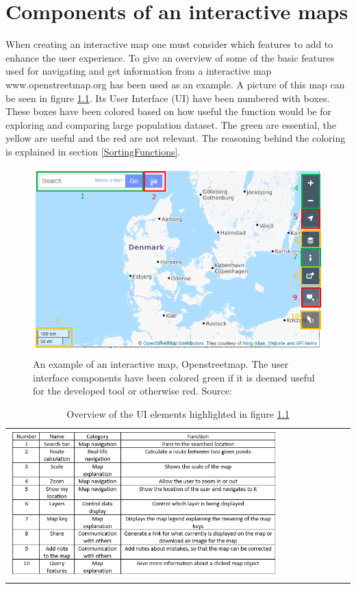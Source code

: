 \chapter{Components of an interactive maps}\label{CInteractiveMap}
When creating an interactive map one must consider which features to add to enhance the user experience. To give an overview of some of the basic features used for navigating and get information from a interactive map www.openstreetmap.org has been used as an example. \citep{OpenStreetMap} A picture of this map can be seen in figure \ref{InteractiveMap}. Its User Interface (UI) have been numbered with boxes. These boxes have been colored based on how useful the function would be for exploring and comparing large population dataset. The green are essential, the yellow are useful and the red are not relevant. The reasoning behind the coloring is explained in section \ref{SortingFunctions}.


\begin{figure} [H]
	\centering
	\includegraphics[width=.8\textwidth]{Pictures/InteractiveMap}
	\caption{An example of an interactive map, Openstreetmap. The user interface components have been colored green if it is deemed useful for the developed tool or otherwise red. Source: \citep{OpenStreetMap}}
	\label{InteractiveMap}
\end{figure}

\begin{table}[htbp]
	\centering
	\begin{tabular}{l}
		\includegraphics[width=0.8\textwidth]{Pictures/tabOSMFunctions}
	\end{tabular}
	\caption{Overview of the UI elements highlighted in figure \ref{InteractiveMap}}
	\label{tabOSMFunctions}
\end{table}

